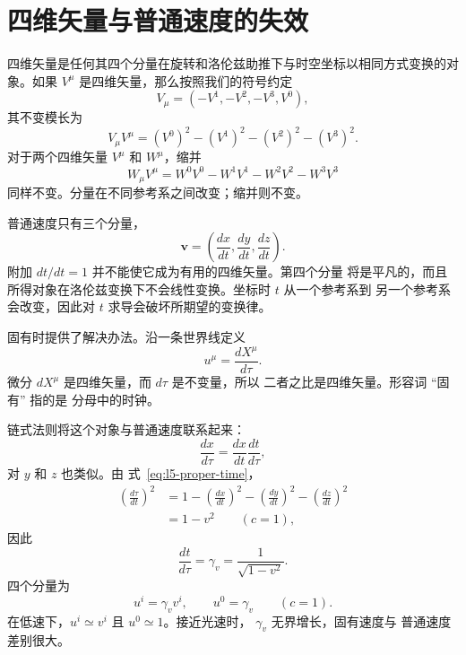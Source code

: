 \section{四维矢量与普通速度的失效}

四维矢量是任何其四个分量在旋转和洛伦兹助推下与时空坐标以相同方式变换的对象。如果 \(V^\mu\) 是四维矢量，那么按照我们的符号约定
\begin{equation}
V_\mu=(-V^1,-V^2,-V^3,V^0),
\end{equation}
其不变模长为
\begin{equation}
V_\mu V^\mu=(V^0)^2-(V^1)^2-(V^2)^2-(V^3)^2.
\end{equation}
对于两个四维矢量 \(V^\mu\) 和 \(W^\mu\)，缩并
\begin{equation}
W_\mu V^\mu
=W^0V^0-W^1V^1-W^2V^2-W^3V^3
\end{equation}
同样不变。分量在不同参考系之间改变；缩并则不变。

普通速度只有三个分量，
\begin{equation}
\mathbf v=\left(\frac{dx}{dt},\frac{dy}{dt},\frac{dz}{dt}\right).
\end{equation}
附加 \(dt/dt=1\) 并不能使它成为有用的四维矢量。第四个分量
将是平凡的，而且所得对象在洛伦兹变换下不会线性变换。坐标时 \(t\) 从一个参考系到
另一个参考系会改变，因此对 \(t\) 求导会破坏所期望的变换律。

固有时提供了解决办法。沿一条世界线定义
\begin{equation}
u^\mu=\frac{dX^\mu}{d\tau}.
\label{eq:l5-four-velocity}
\end{equation}
微分 \(dX^\mu\) 是四维矢量，而 \(d\tau\) 是不变量，所以
二者之比是四维矢量。形容词 ``固有'' 指的是
分母中的时钟。

链式法则将这个对象与普通速度联系起来：
\begin{equation}
\frac{dx}{d\tau}=\frac{dx}{dt}\frac{dt}{d\tau},
\end{equation}
对 \(y\) 和 \(z\) 也类似。由
式~\eqref{eq:l5-proper-time}，
\begin{align}
\left(\frac{d\tau}{dt}\right)^2
&=1-\left(\frac{dx}{dt}\right)^2
    -\left(\frac{dy}{dt}\right)^2
    -\left(\frac{dz}{dt}\right)^2\nonumber\\
&=1-v^2
\qquad(c=1),
\end{align}
因此
\begin{equation}
\frac{dt}{d\tau}=\gamma_v=\frac{1}{\sqrt{1-v^2}}.
\end{equation}
四个分量为
\begin{equation}
u^i=\gamma_v v^i,
\qquad
u^0=\gamma_v
\qquad(c=1).
\label{eq:l5-four-velocity-components}
\end{equation}
在低速下，\(u^i\simeq v^i\) 且 \(u^0\simeq1\)。接近光速时，
\(\gamma_v\) 无界增长，固有速度与
普通速度差别很大。


